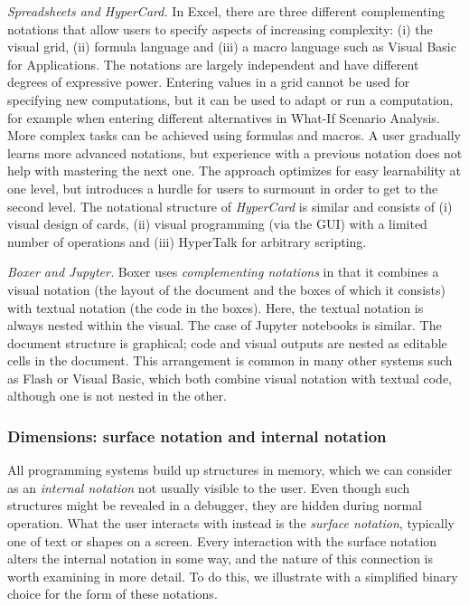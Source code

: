\documentclass[english,submission]{programming}
\begin{document}
\emph{Spreadsheets and HyperCard.} In Excel, there are three different
complementing notations that allow users to specify aspects of
increasing complexity: (i) the visual grid, (ii) formula language and
(iii) a macro language such as Visual Basic for Applications. The
notations are largely independent and have different degrees of
expressive power. Entering values in a grid cannot be used for
specifying new computations, but it can be used to adapt or run a
computation, for example when entering different alternatives in What-If
Scenario Analysis. More complex tasks can be achieved using formulas and
macros. A user gradually learns more advanced notations, but experience
with a previous notation does not help with mastering the next one. The
approach optimizes for easy learnability at one level, but introduces a
hurdle for users to surmount in order to get to the second level. The
notational structure of \emph{HyperCard} is similar and consists of (i)
visual design of cards, (ii) visual programming (via the GUI) with a
limited number of operations and (iii) HyperTalk for arbitrary
scripting.

\emph{Boxer and Jupyter.} Boxer \cite{Boxer} uses \emph{complementing
notations} in that it combines a visual notation (the layout of the
document and the boxes of which it consists) with textual notation (the
code in the boxes). Here, the textual notation is always nested within
the visual. The case of Jupyter notebooks is similar. The document
structure is graphical; code and visual outputs are nested as editable
cells in the document. This arrangement is common in many other systems
such as Flash or Visual Basic, which both combine visual notation with
textual code, although one is not nested in the other.

\hypertarget{dimensions-surface-notation-and-internal-notation}{%
\subsubsection{Dimensions: surface notation and internal
notation}\label{dimensions-surface-notation-and-internal-notation}}

All programming systems build up structures in memory, which we can
consider as an \emph{internal notation} not usually visible to the user.
Even though such structures might be revealed in a debugger, they are
hidden during normal operation. What the user interacts with instead is
the \emph{surface notation}, typically one of text or shapes on a
screen. Every interaction with the surface notation alters the internal
notation in some way, and the nature of this connection is worth
examining in more detail. To do this, we illustrate with a simplified
binary choice for the form of these notations.
\end{document}
